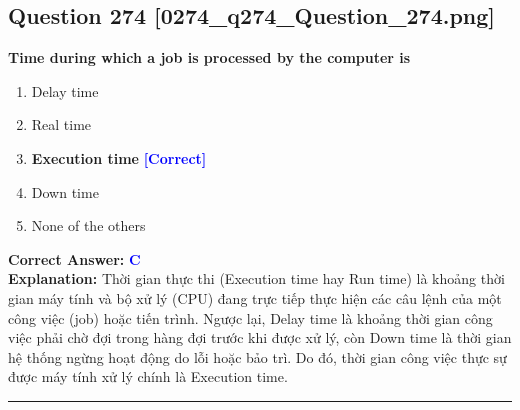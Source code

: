 \documentclass[11pt,a4paper]{article}
\begin{document}
\begin{minipage}{\textwidth}
\subsection*{Question 274 \quad \footnotesize{[0274\_q274\_Question\_274.png]}}
\noindent \textbf{Time during which a job is processed by the computer is}

\begin{enumerate}[label=\Alph*.]
    \item Delay time
    \item Real time
    \item \textbf{Execution time} \hfill \textcolor{blue}{\textbf{[Correct]}}
    \item Down time
    \item None of the others
\end{enumerate}

\noindent \textbf{Correct Answer:} \textcolor{blue}{\textbf{C}} \\[2pt]
\noindent \textbf{Explanation:} Thời gian thực thi (Execution time hay Run time) là khoảng thời gian máy tính và bộ xử lý (CPU) đang trực tiếp thực hiện các câu lệnh của một công việc (job) hoặc tiến trình. Ngược lại, Delay time là khoảng thời gian công việc phải chờ đợi trong hàng đợi trước khi được xử lý, còn Down time là thời gian hệ thống ngừng hoạt động do lỗi hoặc bảo trì. Do đó, thời gian công việc thực sự được máy tính xử lý chính là Execution time.

\par\vspace{0.3cm}
\hrule
\vspace{0.3cm}
\end{minipage}
\end{document}
